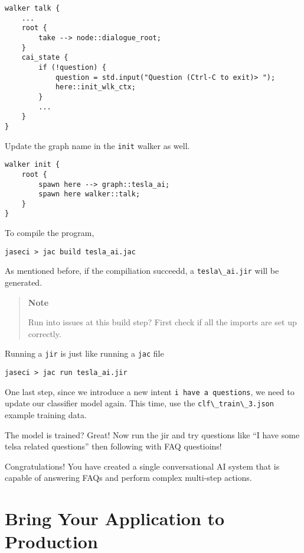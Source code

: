 \begin{lstlisting}
walker talk {
    ...
    root {
        take --> node::dialogue_root;
    }
    cai_state {
        if (!question) {
            question = std.input("Question (Ctrl-C to exit)> ");
            here::init_wlk_ctx;
        }
        ...
    }
}
\end{lstlisting}

Update the graph name in the \passthrough{\lstinline!init!} walker as
well.

\begin{lstlisting}
walker init {
    root {
        spawn here --> graph::tesla_ai;
        spawn here walker::talk;
    }
}
\end{lstlisting}

To compile the program,

\begin{lstlisting}
jaseci > jac build tesla_ai.jac
\end{lstlisting}

As mentioned before, if the compiliation succeedd, a
\passthrough{\lstinline!tesla\_ai.jir!} will be generated.

\begin{quote}
\textbf{Note}

Run into issues at this build step? First check if all the imports are
set up correctly.
\end{quote}

Running a \passthrough{\lstinline!jir!} is just like running a
\passthrough{\lstinline!jac!} file

\begin{lstlisting}
jaseci > jac run tesla_ai.jir
\end{lstlisting}

One last step, since we introduce a new intent
\passthrough{\lstinline!i have a questions!}, we need to update our
classifier model again. This time, use the
\passthrough{\lstinline!clf\_train\_3.json!} example training data.

The model is trained? Great! Now run the jir and try questions like ``I
have some telsa related questions'' then following with FAQ questioins!

Congratulations! You have created a single conversational AI system that
is capable of answering FAQs and perform complex multi-step actions.

\hypertarget{bring-your-application-to-production}{%
\section{Bring Your Application to
Production}\label{bring-your-application-to-production}}

